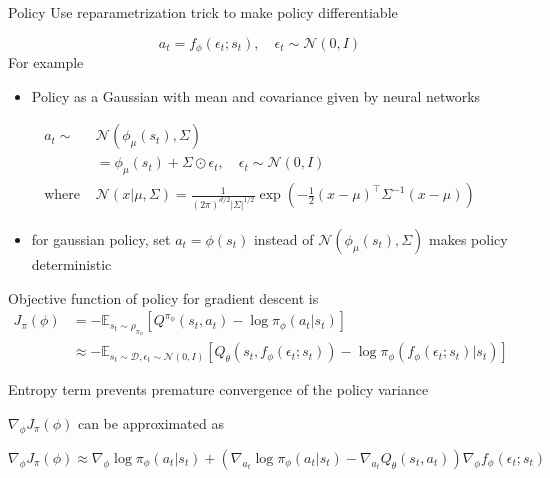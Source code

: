 \documentclass[8pt]{beamer}
\begin{document}
\begin{frame}{Policy}
    Use reparametrization trick to make policy differentiable

    \[
        a_t = f_\phi(\epsilon_t; s_t), \quad \epsilon_t \sim \mathcal{N}(0, I)
    \]
    For example
    \begin{itemize}
        \item Policy as a Gaussian with mean and covariance given by neural networks
    \end{itemize}
    \[
    \begin{aligned}
        a_t \sim &\mathcal{N}(\phi_\mu(s_t), \Sigma) \\
        & = \phi_\mu(s_t) + \Sigma \odot \epsilon_t, \quad \epsilon_t \sim \mathcal{N}(0, I) \\
        \text{where } &\mathcal{N}(x|\mu,\Sigma) = \frac{1}{(2\pi)^{d/2} |\Sigma|^{1/2}} \exp\left(-\frac{1}{2}(x-\mu)^\top \Sigma^{-1} (x-\mu)\right)
    \end{aligned}
    \]
    \begin{itemize}
        \item for gaussian policy, set $a_t = \phi(s_t)$ instead of $\mathcal{N}(\phi_\mu(s_t), \Sigma)$ makes policy deterministic
    \end{itemize}
    Objective function of policy for gradient descent is
    \[
    \begin{aligned}
        J_\pi(\phi) &= - \mathbb{E}_{s_t \sim \rho_{\pi_\phi}}[Q^{\pi_\phi}(s_t, a_t) - \log{\pi_\phi}(a_t|s_t)]\\ 
        &\approx - \mathbb{E}_{s_t \sim \mathcal{D}, \epsilon_t \sim \mathcal{N}(0, I)}[Q_\theta(s_t, f_\phi(\epsilon_t; s_t)) - \log{\pi_\phi}(f_\phi(\epsilon_t; s_t)|s_t)]
    \end{aligned}
    \]

    Entropy term prevents premature convergence of the policy variance

    $\nabla_\phi J_\pi(\phi)$ can be approximated as

    \[
    \nabla_\phi J_\pi(\phi) \approx \nabla_\phi \log{\pi_\phi}(a_t|s_t)+ (\nabla_{a_t} \log{\pi_\phi}(a_t|s_t) - \nabla_{a_t}Q_\theta(s_t, a_t)) \nabla_\phi f_\phi(\epsilon_t; s_t)
    \]
\end{frame}
\end{document}
